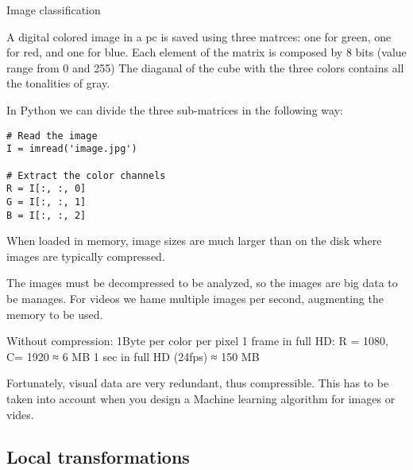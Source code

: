 \caption{Image classification}

A digital colored image in a pc is saved using three matrces: one for green, one for red, and one for blue. 
Each element of the matrix is composed by 8 bits (value range from 0 and 255)
The diaganal of the cube with the three colors contains all the tonalities of gray. 

In Python we can divide the three sub-matrices in the following way: 
\begin{verbatim}
# Read the image
I = imread('image.jpg')

# Extract the color channels
R = I[:, :, 0]
G = I[:, :, 1]
B = I[:, :, 2]
\end{verbatim}
When loaded in memory, image sizes are much larger than on the disk where images are typically compressed. 

The images must be decompressed to be analyzed, so the images are big data to be manages. 
For videos we hame multiple images per second, augmenting the memory to be used. 

Without compression: 1Byte per color per pixel
1 frame in full HD: R = 1080, C= 1920 ≈ 6 MB
1 sec in full HD (24fps) ≈ 150 MB

Fortunately, visual data are very redundant, thus compressible.
This has to be taken into account when you design a Machine learning algorithm for images or vides.


\subsection{Local transformations}






